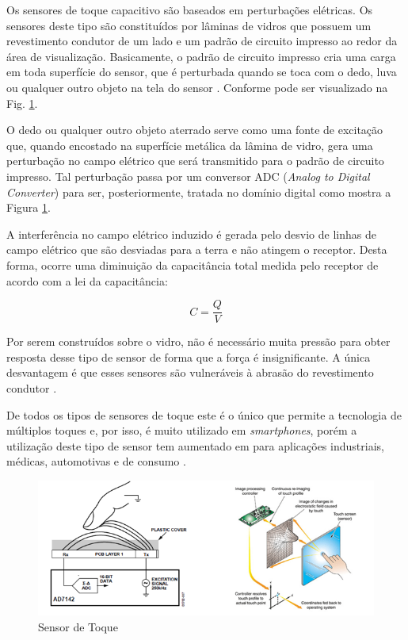 \begin{anexosenv}
Os sensores de toque capacitivo são baseados em perturbações elétricas. Os sensores deste tipo são constituídos por lâminas de vidros que possuem um revestimento condutor de um lado e um padrão de circuito impresso ao redor da área de visualização. Basicamente, o padrão de circuito impresso cria uma carga em toda superfície do sensor, que é perturbada quando se toca com o dedo, luva ou qualquer outro objeto na tela do sensor \cite{mathas}. Conforme pode ser visualizado na Fig. \ref{fig12}.

O dedo ou qualquer outro objeto aterrado serve como uma fonte de excitação que, quando encostado na superfície metálica da lâmina de vidro, gera uma perturbação no campo elétrico que será transmitido para o padrão de circuito impresso. Tal perturbação passa por um conversor ADC (\textit{Analog to Digital Converter}) para ser, posteriormente, tratada no domínio digital \cite{ad7142} como mostra a Figura \ref{fig12}.

A interferência no campo elétrico induzido é gerada pelo desvio de linhas de campo elétrico que são desviadas para a terra e não atingem o receptor. Desta forma, ocorre uma diminuição da capacitância total medida pelo receptor\cite{ad7142} de acordo com a lei da capacitância:

$$ C = \frac{Q}{V} $$

Por serem construídos sobre o vidro, não é necessário muita pressão para obter resposta desse tipo de sensor de forma que a força é insignificante. A única desvantagem é que esses sensores são vulneráveis à abrasão do revestimento condutor \cite{mathas}.

De todos os tipos de sensores de toque este é o único que permite a tecnologia de múltiplos toques e, por isso, é muito utilizado em \textit{smartphones}, porém a utilização deste tipo de sensor tem aumentado em para aplicações industriais, médicas, automotivas e de consumo \cite{mathas}. 

\begin{figure}[htb]
		\centering
			\includegraphics[scale=0.7]{figuras/sensortoque.png}
		\caption{Sensor de Toque}
		\label{fig12}
\end{figure}





\end{anexosenv}
